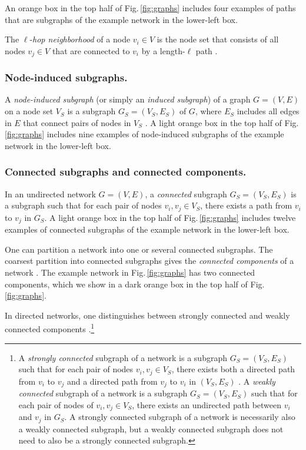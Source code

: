 \documentclass{comnet-mod}
\begin{document}
An orange box in the top half of Fig.\,\ref{fig:graphs} includes four examples of paths that are subgraphs of the example network in the lower-left box.

The $\ell$-\textit{hop neighborhood} of a node $v_i \in V$ is the node set that consists of all nodes $v_j \in V$ that are connected to $v_i$ by a length-$\ell$ path \cite[p.\,4]{Bollobas2013}. 


\subsubsection{Node-induced subgraphs.}

A \textit{node-induced subgraph} (or simply an \textit{induced subgraph}) of a graph $G=(V,E)$ on a node set $V_S$ is a subgraph $G_S=(V_S,E_S)$ of $G$, where $E_S$ includes all edges in $E$ that connect pairs of nodes in $V_S$ \cite[p.\,5]{Thulasiraman2011}.
A light orange box in the top half of Fig.\,\ref{fig:graphs} includes nine examples of node-induced subgraphs of the example network in the lower-left box.


\subsubsection{Connected subgraphs and connected components.}

In an undirected network $G=(V, E)$, a \textit{connected} subgraph $G_S=(V_S,E_S)$ is a subgraph such that for each pair of nodes $v_i,v_j \in V_S$, there exists a path from $v_i$ to $v_j$ in $G_S$.
A light orange box in the top half of Fig.\,\ref{fig:graphs} includes twelve examples of connected subgraphs of the example network in the lower-left box.

One can partition a network into one or several connected subgraphs. The coarsest partition into connected subgraphs gives the \textit{connected components} of a network \cite[p.\,54]{Eiselt2000}. The example network in Fig.\,\ref{fig:graphs} has two connected components, which we show in a dark orange box in the top half of Fig.\,\ref{fig:graphs}.

In directed networks, one distinguishes between strongly connected and weakly connected components \cite[p.\,53]{Eiselt2000}.\footnote{A \textit{strongly connected} subgraph of a network is a subgraph $G_S=(V_S,E_S)$ such that for each pair of nodes $v_i,v_j\in V_S$, there exists both a directed path from $v_i$ to $v_j$ and a directed path from $v_j$ to $v_i$ in $(V_S,E_S)$ \cite[p.\,43]{Tou2012}. A \textit{weakly connected} subgraph of a network is a subgraph $G_S=(V_S,E_S)$ such that for each pair of nodes of $v_i,v_j\in V_S$, there exists an undirected path between $v_i$ and $v_j$ in $G_S$. A strongly connected subgraph of a network is necessarily also a weakly connected subgraph, but a weakly connected subgraph does not need to also be a strongly connected subgraph.}
\end{document}
